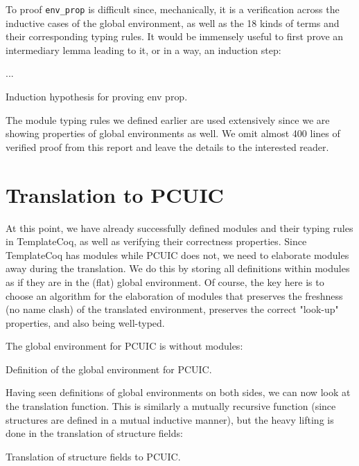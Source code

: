 To proof \verb|env_prop| is difficult since, mechanically, it is a
verification across the inductive cases of the global environment, as well as
the 18 kinds of terms and their corresponding typing rules. It would be
immensely useful to first prove an intermediary lemma leading to it, or in a
way, an induction step:

\begin{listing}[H]
  ...
  \caption{Induction hypothesis for proving env prop.}
  \label{lst:1-def-env-prop-ind}
\end{listing}

The module typing rules we defined earlier are used extensively since we are
showing properties of global environments as well. We omit almost 400 lines of
verified proof from this report and leave the details to the interested reader.



\section{Translation to PCUIC}

At this point, we have already successfully defined modules and their typing
rules in TemplateCoq, as well as verifying their correctness properties. Since
TemplateCoq has modules while PCUIC does not, we need to elaborate modules away
during the translation. We do this by storing all definitions within modules as
if they are in the (flat) global environment. Of course, the key here is to
choose an algorithm for the elaboration of modules that preserves the freshness
(no name clash) of the translated environment, preserves the correct "look-up"
properties, and also being well-typed.

The global environment for PCUIC is without modules:

\begin{listing}[H]
  \caption{Definition of the global environment for PCUIC.}
  \label{lst:1-def-pcuic-env}
\end{listing}

Having seen definitions of global environments on both sides, we can now look at
the translation function. This is similarly a mutually recursive function (since
structures are defined in a mutual inductive manner), but the heavy lifting is
done in the translation of structure fields:

\begin{listing}[H]
  \caption{Translation of structure fields to PCUIC.}
  \label{lst:1-trans-pcuic-sf}
\end{listing}

